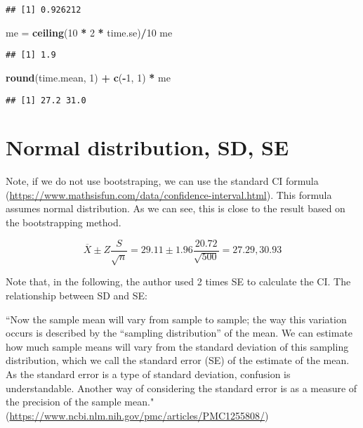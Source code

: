 \documentclass[]{book}
\newenvironment{Shaded}{\begin{snugshade}}{\end{snugshade}}
\newcommand{\DecValTok}[1]{\textcolor[rgb]{0.00,0.00,0.81}{#1}}
\newcommand{\KeywordTok}[1]{\textcolor[rgb]{0.13,0.29,0.53}{\textbf{#1}}}
\newcommand{\NormalTok}[1]{#1}
\newcommand{\OperatorTok}[1]{\textcolor[rgb]{0.81,0.36,0.00}{\textbf{#1}}}
\newcommand{\StringTok}[1]{\textcolor[rgb]{0.31,0.60,0.02}{#1}}
\begin{document}
\begin{verbatim}
## [1] 0.926212
\end{verbatim}

\begin{Shaded}
\begin{Highlighting}[]
\NormalTok{me =}\StringTok{ }\KeywordTok{ceiling}\NormalTok{(}\DecValTok{10} \OperatorTok{*}\StringTok{ }\DecValTok{2} \OperatorTok{*}\StringTok{ }\NormalTok{time.se)}\OperatorTok{/}\DecValTok{10}
\NormalTok{me}
\end{Highlighting}
\end{Shaded}

\begin{verbatim}
## [1] 1.9
\end{verbatim}

\begin{Shaded}
\begin{Highlighting}[]
\KeywordTok{round}\NormalTok{(time.mean, }\DecValTok{1}\NormalTok{) }\OperatorTok{+}\StringTok{ }\KeywordTok{c}\NormalTok{(}\OperatorTok{-}\DecValTok{1}\NormalTok{, }\DecValTok{1}\NormalTok{) }\OperatorTok{*}\StringTok{ }\NormalTok{me}
\end{Highlighting}
\end{Shaded}

\begin{verbatim}
## [1] 27.2 31.0
\end{verbatim}

\hypertarget{normal-distribution-sd-se}{%
\section{Normal distribution, SD, SE}\label{normal-distribution-sd-se}}

Note, if we do not use bootstraping, we can use the standard CI formula (\url{https://www.mathsisfun.com/data/confidence-interval.html}). This formula assumes normal distribution. As we can see, this is close to the result based on the bootstrapping method.

\[\overline{X} \pm Z \frac{S}{\sqrt{n}}=29.11 \pm 1.96 \frac{20.72}{\sqrt{500}}=27.29, 30.93\]

Note that, in the following, the author used 2 times SE to calculate the CI. The relationship between SD and SE:

``Now the sample mean will vary from sample to sample; the way this variation occurs is described by the ``sampling distribution'' of the mean. We can estimate how much sample means will vary from the standard deviation of this sampling distribution, which we call the standard error (SE) of the estimate of the mean. As the standard error is a type of standard deviation, confusion is understandable. Another way of considering the standard error is as a measure of the precision of the sample mean." (\url{https://www.ncbi.nlm.nih.gov/pmc/articles/PMC1255808/})
\end{document}
